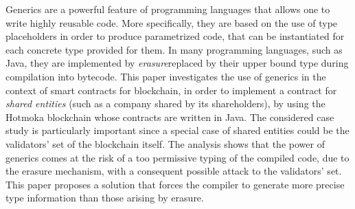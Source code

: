 Generics are a powerful feature of programming languages that allows one
to write highly reusable code.
%
More specifically, they are based on the use of type placeholders in order
to produce parametrized code, that can be instantiated for each
concrete type provided for them. 
%
In many programming languages, such as Java, they are implemented by
\emph{erasure}\ie replaced by their upper bound type during compilation into bytecode.
%
This paper investigates the use of generics in the
context of smart contracts for blockchain, in order to implement
a contract for \emph{shared entities} (such as a company shared
by its shareholders),
by using the Hotmoka blockchain whose contracts are written in Java.
%
The considered case study is particularly important since
a special case of shared entities could be the validators' set of
the blockchain itself. The analysis shows that the power of generics comes at the risk of a too permissive
typing of the compiled code, due to the erasure mechanism, with a consequent possible attack
to the validators' set. This paper proposes a solution
that forces the compiler to generate more precise type information than
those arising by erasure.
